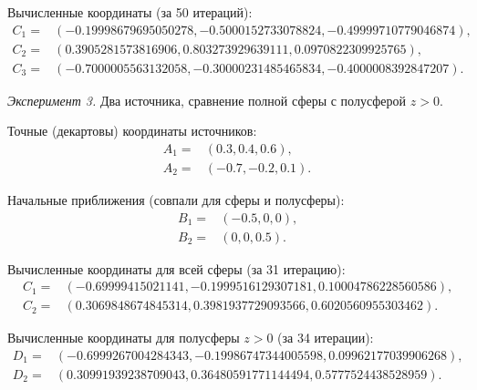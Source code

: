 Вычисленные координаты (за 50 итераций):
\begin{align}
    C_1 =& (-0.19998679695050278, -0.5000152733078824, -0.49999710779046874) \text{,}\nonumber\\
    C_2 =& (0.3905281573816906, 0.803273929639111, 0.0970822309925765) \text{,}\nonumber\\
    C_3 =& (-0.7000005563132058, -0.30000231485465834, -0.4000008392847207) \text{.}\nonumber
\end{align}

\emph{Эксперимент 3.} Два источника, сравнение полной сферы с полусферой $z > 0$.

Точные (декартовы) координаты источников:
\begin{align}
    A_1 =& (0.3, 0.4, 0.6) \text{,}\nonumber\\
    A_2 =& (-0.7, -0.2, 0.1) \text{.}\nonumber
\end{align}

Начальные приближения (совпали для сферы и полусферы):
\begin{align}
    B_1 =& (-0.5, 0, 0) \text{,}\nonumber\\
    B_2 =& (0, 0, 0.5) \text{.}\nonumber
\end{align}

Вычисленные координаты для всей сферы (за 31 итерацию):
\begin{align}
    C_1 =& (-0.69999415021141, -0.1999516129307181, 0.10004786228560586) \text{,}\nonumber\\
    C_2 =& (0.3069848674845314, 0.3981937729093566, 0.6020560955303462) \text{.}\nonumber
\end{align}

Вычисленные координаты для полусферы $z > 0$ (за 34 итерации):
\begin{align}
    D_1 =& (-0.6999267004284343, -0.19986747344005598, 0.09962177039906268) \text{,}\nonumber\\
    D_2 =& (0.30991939238709043, 0.36480591771144494, 0.5777524438528959) \text{.}\nonumber
\end{align}
